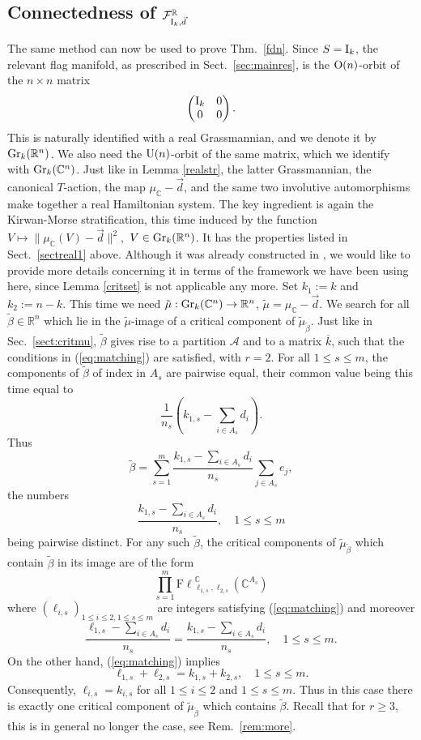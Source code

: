 \documentclass[12pt]{amsart}
\theoremstyle{definition}
\theoremstyle{remark}
\newcommand{\RR}{\mathbb R}
\newcommand{\CC}{\mathbb C}
\newcommand{\Fl}{{\mathrm{F\ell}}}
\begin{document}
\subsection{Connectedness of ${\mathcal F}^\RR_{{\rm I}_k, \vec{d}}$}
The same method  can now be used to prove Thm.~\ref{fdn}. Since $S={\rm I}_k$, the relevant flag manifold, as prescribed in Sect.~\ref{sec:mainres}, is the ${\rm O}(n)$-orbit of the $n \times n$ matrix
$$\begin{pmatrix}
{\rm I}_k& 0\\
0 &0
\end{pmatrix}.$$
This is naturally identified with a real Grassmannian, and we denote it by ${\rm Gr}_k(\RR^n)$. We also need the ${\rm U}(n)$-orbit of the same matrix, which we identify with ${\rm Gr}_k(\CC^n)$.  Just like in Lemma \ref{realstr}, the latter Grassmannian, 
the canonical $T$-action, the map $\mu_\CC-\vec{d}$, and the same two involutive automorphisms make together a real Hamiltonian system. 
The key ingredient is again the Kirwan-Morse stratification, this time induced by the function
$
V\longmapsto \|\mu_\CC(V)-\vec{d}\|^2,
$
$V\in {\rm Gr}_k({\mathbb R}^n)$. 
It has the properties listed in Sect.~\ref{sectreal1} above.  Although it was already constructed in \cite[Sect.~3]{Ma1}, we would like to provide more details concerning it in terms of the framework we have been using here, since Lemma \ref{critset} is not applicable any more. Set $k_1:=k$ and $k_2:=n-k$. This time we need $\tilde{\mu} : {\rm Gr}_k(\mathbb C^n) \to \RR^n$, $\tilde{\mu}=\mu_\CC-\vec{d}$. We search for all $\tilde{\beta}\in \RR^n$ which lie in the $\tilde{\mu}$-image
of a critical component of $\tilde{\mu}_{\tilde{\beta}}$. Just like in Sec.~\ref{sect:critmu}, $\tilde{\beta}$ gives rise to a partition ${\mathcal A}$ and to a matrix
$\overline{k}$, such that the conditions in (\ref{eq:matching}) are satisfied, with $r=2$. For all $1\le s\le m$, the components of $\tilde{\beta}$ of index in $A_s$ are pairwise equal, their common value being this time equal to
$$\frac{1}{n_s}(k_{1,s}-\sum_{i\in A_s}d_{i}).$$ 
Thus
$$\tilde{\beta}= \sum_{s=1}^m \frac{k_{1,s}-\sum_{i\in A_s}d_{i}}{n_s}\sum_{j\in A_s}e_j,$$
the numbers 
$$\frac{k_{1,s}-\sum_{i\in A_s}d_{i}}{n_s}, \quad 1\le s\le m$$
being pairwise distinct. For any such $\tilde{\beta}$, the critical components of $\tilde{\mu}_{\tilde{\beta}}$ which contain $\tilde{\beta}$ in its image are of the form
$$\prod_{s=1}^m \Fl^\CC_{\ell_{1,s}, \ell_{2,s}}(\CC^{A_s})$$
where $(\ell_{i,s})_{1\le i \le 2, 1\le s\le m}$ are integers satisfying (\ref{eq:matching}) and moreover
$$\frac{\ell_{1,s}-\sum_{i\in A_s}d_{i}}{n_s}=\frac{k_{1,s}-\sum_{i\in A_s}d_{i}}{n_s}, \quad 1\le s\le m.$$
On the other hand, (\ref{eq:matching}) implies
$$\ell_{1,s}+\ell_{2,s} =k_{1,s}+k_{2,s}, \quad 1\le s\le m.$$
Consequently, $\ell_{i,s}=k_{i,s}$ for all $1\le i \le 2$ and $1\le s\le m$. Thus in this case there is exactly one critical component of $\tilde{\mu}_{\tilde{\beta}}$ which contains
$\tilde{\beta}$. Recall that for $r\ge 3$, this is in general no longer the case, see Rem.~\ref{rem:more}.
\end{document}
